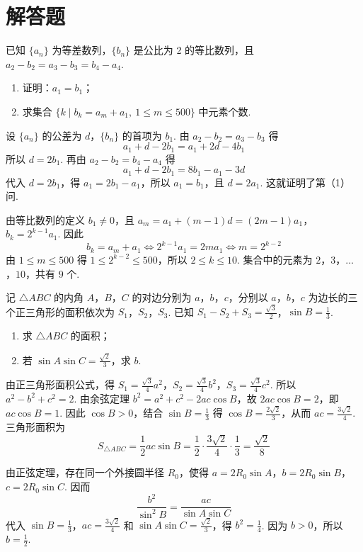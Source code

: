 \section{解答题}

\begin{problem}
已知 \(\{a_n\}\) 为等差数列，\(\{b_n\}\) 是公比为 2 的等比数列，且 \(a_2-b_2=a_3-b_3=b_4-a_4\).
\begin{enumerate}
\item 证明：\(a_1=b_1\)；
\item 求集合 \(\{k\mid b_k=a_m+a_1,\ 1\le m\le 500\}\) 中元素个数.
\end{enumerate}
\end{problem}

\begin{solution}
设 \(\{a_n\}\) 的公差为 \(d\)，\(\{b_n\}\) 的首项为 \(b_1\). 由
\(a_2-b_2=a_3-b_3\) 得
\[
a_1+d-2b_1=a_1+2d-4b_1
\]
所以 \(d=2b_1\). 再由 \(a_2-b_2=b_4-a_4\) 得
\[
a_1+d-2b_1=8b_1-a_1-3d
\]
代入 \(d=2b_1\)，得 \(a_1=2b_1-a_1\)，所以 \(a_1=b_1\)，且 \(d=2a_1\). 这就证明了第（1）问.

由等比数列的定义 \(b_1\ne0\)，且
\(a_m=a_1+(m-1)d=(2m-1)a_1\)，\(b_k=2^{k-1}a_1\). 因此
\[
b_k=a_m+a_1
\Longleftrightarrow
2^{k-1}a_1=2ma_1
\Longleftrightarrow
m=2^{k-2}
\]
由 \(1\le m\le500\) 得 \(1\le2^{k-2}\le500\)，所以 \(2\le k\le10\). 集合中的元素为 \(2\)，\(3\)，\(\ldots\)，\(10\)，共有 \(9\) 个.
\end{solution}


\begin{problem}
记 \(\triangle ABC\) 的内角 \(A\)，\(B\)，\(C\) 的对边分别为 \(a\)，\(b\)，\(c\)，分别以 \(a\)，\(b\)，\(c\) 为边长的三个正三角形的面积依次为 \(S_1\)，\(S_2\)，\(S_3\). 已知 \(S_1-S_2+S_3=\frac{\sqrt3}{2}\)，\(\sin B=\frac13\).
\begin{enumerate}
\item 求 \(\triangle ABC\) 的面积；
\item 若 \(\sin A\sin C=\frac{\sqrt2}{3}\)，求 \(b\).
\end{enumerate}
\end{problem}

\begin{solution}
由正三角形面积公式，得
\(S_1=\frac{\sqrt3}{4}a^2\)，\(S_2=\frac{\sqrt3}{4}b^2\)，\(S_3=\frac{\sqrt3}{4}c^2\). 所以
\(a^2-b^2+c^2=2\). 由余弦定理
\(b^2=a^2+c^2-2ac\cos B\)，故 \(2ac\cos B=2\)，即 \(ac\cos B=1\). 因此 \(\cos B>0\)，结合 \(\sin B=\frac13\) 得 \(\cos B=\frac{2\sqrt2}{3}\)，从而 \(ac=\frac{3\sqrt2}{4}\). 三角形面积为
\[
S_{\triangle ABC}=\frac12ac\sin B=\frac12\cdot\frac{3\sqrt2}{4}\cdot\frac13=\frac{\sqrt2}{8}
\]

由正弦定理，存在同一个外接圆半径 \(R_0\)，使得 \(a=2R_0\sin A\)，\(b=2R_0\sin B\)，\(c=2R_0\sin C\). 因而
\[
\frac{b^2}{\sin^2B}=\frac{ac}{\sin A\sin C}
\]
代入 \(\sin B=\frac13\)，\(ac=\frac{3\sqrt2}{4}\) 和 \(\sin A\sin C=\frac{\sqrt2}{3}\)，得
\(b^2=\frac14\). 因为 \(b>0\)，所以 \(b=\frac12\).
\end{solution}


